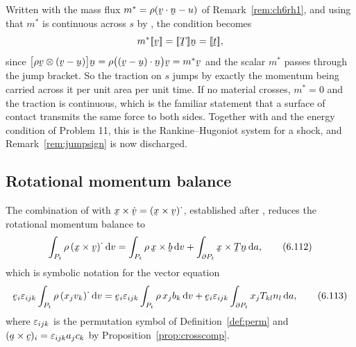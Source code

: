 \begin{remark}\label{rem:ch6rh2}
Written with the mass flux $m^{*}=\rho(\ip\bv\bn-u)$ of
Remark~\ref{rem:ch6rh1}, and using that $m^{*}$ is continuous across
$s$ by , the condition  becomes
\[
   m^{*}\jump\bv=\jump\bT\bn=\jump\bt ,
\]
since $\big[\rho\bv\otimes(\bv-\bu)\big]\bn
=\rho\big(\ip{(\bv-\bu)}\bn\big)\bv=m^{*}\bv$ and the scalar $m^{*}$
passes through the jump bracket. So the traction on $s$ jumps by
exactly the momentum being carried across it per unit area per unit
time. If no material crosses, $m^{*}=0$ and the traction is
continuous, which is the familiar statement that a surface of contact
transmits the same force to both sides. Together with  and
the energy condition of Problem 11, this is the Rankine--Hugoniot
system for a shock, and Remark~\ref{rem:jumpsign} is now discharged.
\end{remark}

\subsection{Rotational momentum balance}\label{sec:ch6rotbal}

The combination of  with $\bx\times\dot\bv
=(\bx\times\bv)^{\textstyle\cdot}$, established after ,
reduces the rotational momentum balance  to
\begin{equation}
   \int_{P_{t}}\rho\,(\bx\times\bv)^{\textstyle\cdot}\,\dl v
   =\int_{P_{t}}\rho\,\bx\times\bb\,\dl v
   +\int_{\partial P_{t}}\bx\times\bT\bn\,\dl a ,
   \tag{6.112}\label{eq:6.112}
\end{equation}
which is symbolic notation for the vector equation
\begin{equation}
   \be_{i}\eps_{ijk}\int_{P_{t}}\rho\,(x_{j}v_{k})^{\textstyle\cdot}
   \,\dl v
   =\be_{i}\eps_{ijk}\int_{P_{t}}\rho\,x_{j}b_{k}\,\dl v
   +\be_{i}\eps_{ijk}\int_{\partial P_{t}}x_{j}T_{kl}n_{l}\,\dl a ,
   \tag{6.113}\label{eq:6.113}
\end{equation}
where $\varepsilon_{ijk}$ is the permutation symbol of
Definition~\ref{def:perm} and $(\ba\times\bc)_{i}=\eps_{ijk}a_{j}c_{k}$
by Proposition~\ref{prop:crosscomp}.

